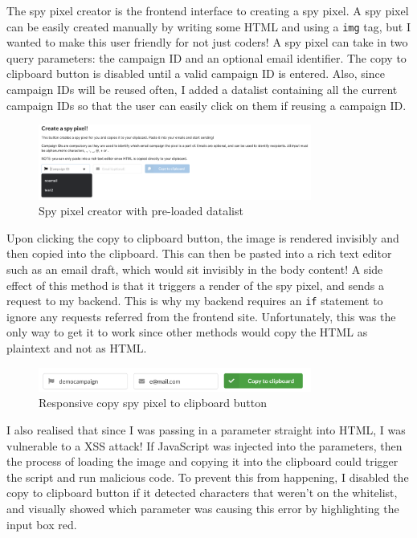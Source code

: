 \documentclass{article}
\begin{document}
The spy pixel creator is the frontend interface to creating a spy pixel. A spy pixel can be easily created manually by writing some HTML and using a \texttt{img} tag, but I wanted to make this user friendly for not just coders! A spy pixel can take in two query parameters: the campaign ID and an optional email identifier. The copy to clipboard button is disabled until a valid campaign ID is entered. Also, since campaign IDs will be reused often, I added a datalist containing all the current campaign IDs so that the user can easily click on them if reusing a campaign ID.

\begin{figure}[H]
\centering
\includegraphics[width=0.8\textwidth]{images/create-spy-pixel.png}
\caption{Spy pixel creator with pre-loaded datalist}
\end{figure}

Upon clicking the copy to clipboard button, the image is rendered invisibly and then copied into the clipboard. This can then be pasted into a rich text editor such as an email draft, which would sit invisibly in the body content! A side effect of this method is that it triggers a render of the spy pixel, and sends a request to my backend. This is why my backend requires an \texttt{if} statement to ignore any requests referred from the frontend site. Unfortunately, this was the only way to get it to work since other methods would copy the HTML as plaintext and not as HTML.

\begin{figure}[H]
\centering
\includegraphics[width=0.8\textwidth]{images/copy-to-clipboard.png}
\caption{Responsive copy spy pixel to clipboard button}
\end{figure}

I also realised that since I was passing in a parameter straight into HTML, I was vulnerable to a XSS attack! If JavaScript was injected into the parameters, then the process of loading the image and copying it into the clipboard could trigger the script and run malicious code. To prevent this from happening, I disabled the copy to clipboard button if it detected characters that weren't on the whitelist, and visually showed which parameter was causing this error by highlighting the input box red.
\end{document}

